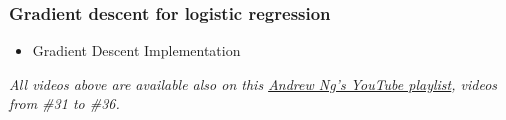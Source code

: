 \subsubsection*{Gradient descent for logistic regression}
\begin{itemize}
  \item Gradient Descent Implementation
\end{itemize}


\emph{All videos above are available also on this \href{https://youtube.com/playlist?list=PLkDaE6sCZn6FNC6YRfRQc_FbeQrF8BwGI&feature=shared}{Andrew Ng's YouTube playlist}, videos from \#31 to \#36.}